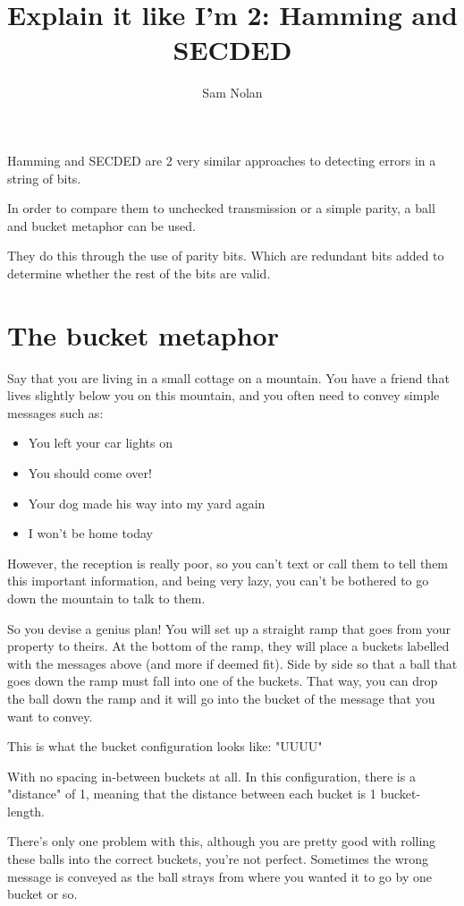 \documentclass{article}
\author{Sam Nolan}
\title{Explain it like I'm 2: Hamming and SECDED}
\begin{document}
  \maketitle
  
  Hamming and SECDED are 2 very similar approaches to detecting errors in a string of bits.

  In order to compare them to unchecked transmission or a simple parity, a ball and bucket metaphor can be used.

  They do this through the use of parity bits. Which are redundant bits added to determine whether the rest of the bits are valid.

  \section*{The bucket metaphor}
  Say that you are living in a small cottage on a mountain. You have a friend that lives slightly below you on this mountain, and you often need to convey simple messages
  such as:

  \begin{itemize}
    \item You left your car lights on
    \item You should come over!
    \item Your dog made his way into my yard again
    \item I won't be home today
  \end{itemize}

  However, the reception is really poor, so you can't text or call them to tell them this important information, and being very lazy, you can't be bothered to go down the mountain to talk to them.

  So you devise a genius plan! You will set up a straight ramp that goes from your property to theirs. At the bottom of the ramp, they will place a buckets labelled with the messages above (and more if deemed fit). Side by side so that a ball that goes down the ramp must fall into one of the buckets. That way, you can drop the ball down the ramp and it will go into the bucket of the message that you want to convey.

  This is what the bucket configuration looks like: "UUUU"

  
  With no spacing in-between buckets at all. In this configuration, there is a "distance" of 1, meaning that the distance between each bucket is 1 bucket-length.

  There's only one problem with this, although you are pretty good with rolling these balls into the correct buckets, you're not perfect. Sometimes the wrong message is conveyed as the ball strays from where you wanted it to go by one bucket or so.
\end{document}
